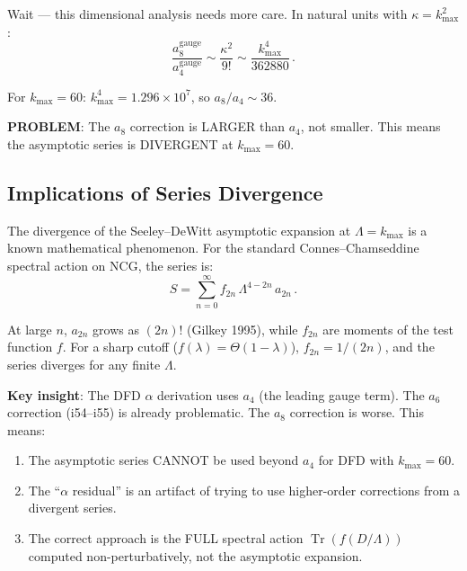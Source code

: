 \documentclass[11pt,a4paper]{article}
\newcommand{\Tr}{\operatorname{Tr}}
\begin{document}
Wait --- this dimensional analysis needs more care. In natural units with $\kappa = k_{\max}^2$:
\begin{equation}
\frac{a_8^{\mathrm{gauge}}}{a_4^{\mathrm{gauge}}} \sim \frac{\kappa^2}{9!} \sim \frac{k_{\max}^4}{362880}\,.
\end{equation}

For $k_{\max} = 60$: $k_{\max}^4 = 1.296 \times 10^7$, so $a_8/a_4 \sim 36$.

\textbf{PROBLEM}: The $a_8$ correction is LARGER than $a_4$, not smaller. This means the asymptotic series is DIVERGENT at $k_{\max} = 60$.

\subsection{Implications of Series Divergence}

The divergence of the Seeley--DeWitt asymptotic expansion at $\Lambda = k_{\max}$ is a known mathematical phenomenon. For the standard Connes--Chamseddine spectral action on NCG, the series is:
\begin{equation}
S = \sum_{n=0}^{\infty} f_{2n}\,\Lambda^{4-2n}\,a_{2n}\,.
\end{equation}

At large $n$, $a_{2n}$ grows as $(2n)!$ (Gilkey 1995), while $f_{2n}$ are moments of the test function $f$. For a sharp cutoff ($f(\lambda) = \Theta(1 - \lambda)$), $f_{2n} = 1/(2n)$, and the series diverges for any finite $\Lambda$.

\textbf{Key insight}: The DFD $\alpha$ derivation uses $a_4$ (the leading gauge term). The $a_6$ correction (i54--i55) is already problematic. The $a_8$ correction is worse. This means:

\begin{enumerate}
\item The asymptotic series CANNOT be used beyond $a_4$ for DFD with $k_{\max} = 60$.
\item The ``$\alpha$ residual'' is an artifact of trying to use higher-order corrections from a divergent series.
\item The correct approach is the FULL spectral action $\Tr(f(D/\Lambda))$ computed non-perturbatively, not the asymptotic expansion.
\end{enumerate}
\end{document}
